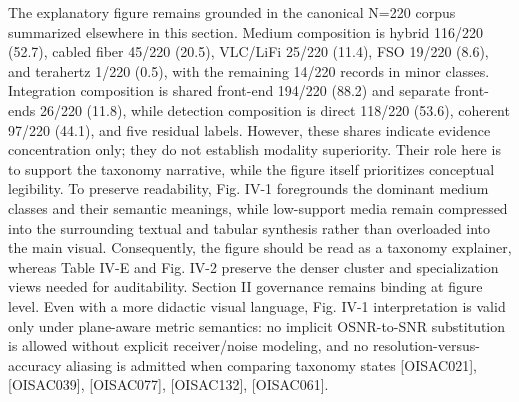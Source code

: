 {}The explanatory figure remains grounded in the canonical N=220 corpus summarized elsewhere in this section. Medium composition is hybrid 116/220 (52.7\markdownRendererPercentSign{}), cabled fiber 45/220 (20.5\markdownRendererPercentSign{}), VLC/LiFi 25/220 (11.4\markdownRendererPercentSign{}), FSO 19/220 (8.6\markdownRendererPercentSign{}), and terahertz 1/220 (0.5\markdownRendererPercentSign{}), with the remaining 14/220 records in minor classes. Integration composition is shared front-end 194/220 (88.2\markdownRendererPercentSign{}) and separate front-ends 26/220 (11.8\markdownRendererPercentSign{}), while detection composition is direct 118/220 (53.6\markdownRendererPercentSign{}), coherent 97/220 (44.1\markdownRendererPercentSign{}), and five residual labels. However, these shares indicate evidence concentration only; they do not establish modality superiority. Their role here is to support the taxonomy narrative, while the figure itself prioritizes conceptual legibility.\markdownRendererParagraphSeparator
{}To preserve readability, Fig. IV-1 foregrounds the dominant medium classes and their semantic meanings, while low-support media remain compressed into the surrounding textual and tabular synthesis rather than overloaded into the main visual. Consequently, the figure should be read as a taxonomy explainer, whereas Table IV-E and Fig. IV-2 preserve the denser cluster and specialization views needed for auditability.\markdownRendererParagraphSeparator
{}\markdownRendererParagraphSeparator
{}Section II governance remains binding at figure level. Even with a more didactic visual language, Fig. IV-1 interpretation is valid only under plane-aware metric semantics: no implicit OSNR-to-SNR substitution is allowed without explicit receiver/noise modeling, and no resolution-versus-accuracy aliasing is admitted when comparing taxonomy states [O\markdownRendererUnderscore{}ISAC\markdownRendererUnderscore{}021], [O\markdownRendererUnderscore{}ISAC\markdownRendererUnderscore{}039], [O\markdownRendererUnderscore{}ISAC\markdownRendererUnderscore{}077], [O\markdownRendererUnderscore{}ISAC\markdownRendererUnderscore{}132], [O\markdownRendererUnderscore{}ISAC\markdownRendererUnderscore{}061].\markdownRendererInterblockSeparator
